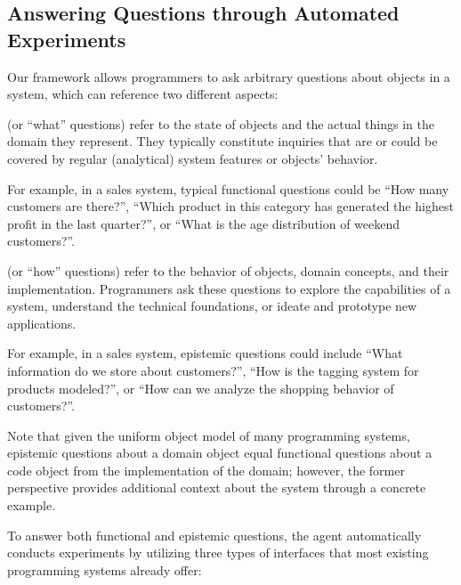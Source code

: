 \subsection*{Answering Questions through Automated Experiments}

Our framework allows programmers to ask arbitrary questions about objects in a system, which can reference two different aspects:

\begin{description}[noextralabelsep]
	\item[Functional questions] (or ``what'' questions) refer to the state of objects and the actual things in the domain they represent.
	They typically constitute inquiries that are or could be covered by regular (analytical) system features or objects' behavior.

	For example, in a sales system, typical functional questions could be ``How many customers are there?'', ``Which product in this category has generated the highest profit in the last quarter?'', or ``What is the age distribution of weekend customers?''.

	\item[Epistemic questions] (or ``how'' questions) refer to the behavior of objects, domain concepts, and their implementation.
	Programmers ask these questions to explore the capabilities of a system, understand the technical foundations, or ideate and prototype new applications.

	For example, in a sales system, epistemic questions could include ``What information do we store about customers?'', ``How is the tagging system for products modeled?'', or ``How can we analyze the shopping behavior of customers?''.

	Note that given the uniform object model of many programming systems, epistemic questions about a domain object equal functional questions about a code object from the implementation of the domain; however, the former perspective provides additional context about the system through a concrete example.
\end{description}

To answer both functional and epistemic questions, the agent automatically conducts experiments by utilizing three types of interfaces that most existing programming systems already offer:

